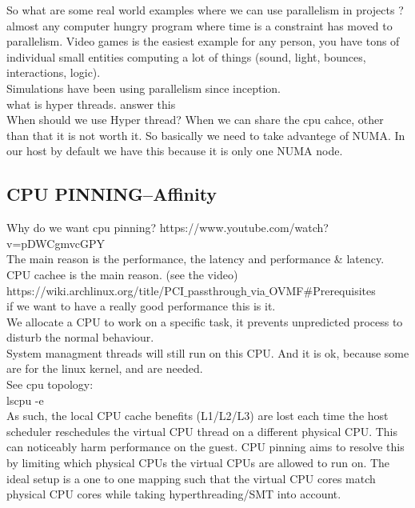 \documentclass[11pt, a4paper, oneside]{article}
\theoremstyle{definition}
\begin{document}
So what are some real world examples where we can use parallelism in projects ?\\
almost any computer hungry program where time is a constraint has moved to parallelism. Video games is the easiest example for any person, you have tons of individual small entities computing a lot of things (sound, light, bounces, interactions, logic).\\
Simulations have been using parallelism since inception.\\

what is hyper threads. answer this\\
When should we use Hyper thread? When we can share the cpu cahce, other than that it is not worth it. So basically we need to take advantege of NUMA. In our host by default we have this because it is only one NUMA node.\\

\subsection{CPU PINNING--Affinity}
Why do we want cpu pinning? https://www.youtube.com/watch?v=pDWCgmvcGPY\\
The main reason is the performance, the latency and performance \& latency.\\
CPU cachee is the main reason. (see the video)\\


https://wiki.archlinux.org/title/PCI$\_$passthrough$\_$via$\_$OVMF$\#$Prerequisites\\

if we want to have a really good performance this is it.\\
We allocate a CPU to work on a specific task, it prevents unpredicted process to disturb the normal behaviour.\\
System managment threads will still run on this CPU. And it is ok, because some are for the linux kernel, and are needed.\\

See cpu topology:\\
lscpu -e\\

As such, the local CPU cache benefits (L1/L2/L3) are lost each time the host scheduler reschedules the virtual CPU thread on a different physical CPU. This can noticeably harm performance on the guest. CPU pinning aims to resolve this by limiting which physical CPUs the virtual CPUs are allowed to run on. The ideal setup is a one to one mapping such that the virtual CPU cores match physical CPU cores while taking hyperthreading/SMT into account. \\
\end{document}
